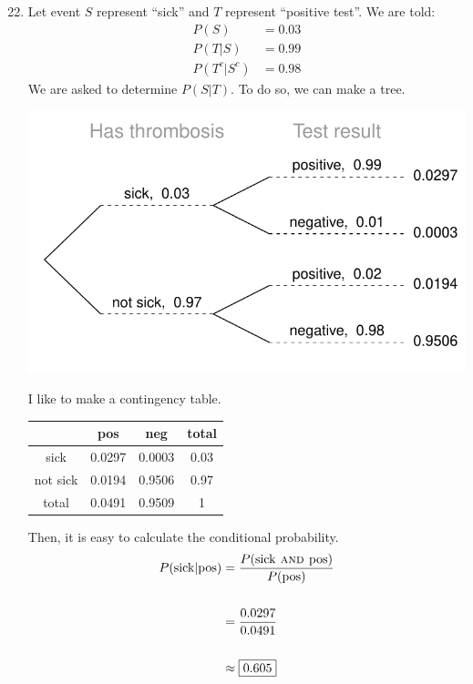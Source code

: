 \documentclass[12pt,letterpaper]{article}
\begin{document}
\newcommand{\AND}{\textsc{~and~}}
\newcommand{\OR}{\textsc{~or~}}

\begin{enumerate}
\setcounter{enumi}{21}
\item Let event $S$ represent ``sick'' and $T$ represent ``positive test''.
We are told:
\begin{align*}
P(S) &= 0.03 \\
P(T|S) &= 0.99 \\
P(T^c|S^c) &= 0.98
\end{align*}
We are asked to determine $P(S|T)$. To do so, we can make a tree.
\begin{center}
\includegraphics[scale=0.8]{figures/thromb.pdf}
\end{center}
I like to make a contingency table.
\begin{center}
\begin{tabular}{c | c c | c} 
         & pos    & neg    & total \\ \hline
sick     & 0.0297 & 0.0003 & 0.03 \\
not sick & 0.0194 & 0.9506 & 0.97 \\ \hline 
total    & 0.0491 & 0.9509 & 1 
\end{tabular}
\end{center}
Then, it is easy to calculate the conditional probability.
\begin{align*}
P(\text{sick}|\text{pos}) &= \frac{P(\text{sick} \AND \text{pos})}{P(\text{pos})} \\\\
&= \frac{0.0297}{0.0491} \\\\
&\approx \fbox{0.605}
\end{align*}


\end{enumerate}
\end{document}
